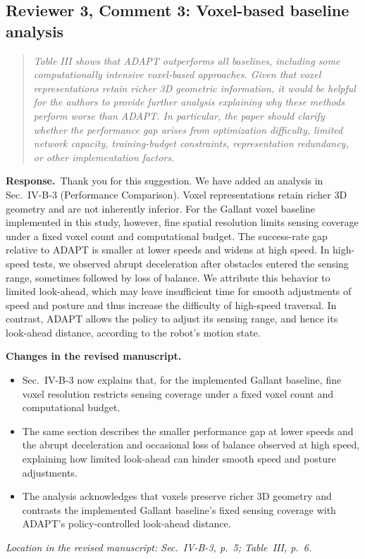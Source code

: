 \documentclass[11pt]{article}
\newenvironment{reviewcomment}{\begin{quote}\color{reviewblue}\itshape}{\end{quote}}
\newcommand{\Response}{\par\noindent\textbf{Response.}\ }
\newcommand{\Changes}{\par\noindent\textbf{Changes in the revised manuscript.}\ }
\newcommand{\Location}[1]{\par\noindent\textit{Location in the revised manuscript: #1}}
\begin{document}
\subsection*{Reviewer 3, Comment 3: Voxel-based baseline analysis}
\begin{reviewcomment}
Table III shows that ADAPT outperforms all baselines, including some computationally intensive voxel-based approaches. Given that voxel representations retain richer 3D geometric information, it would be helpful for the authors to provide further analysis explaining why these methods perform worse than ADAPT. In particular, the paper should clarify whether the performance gap arises from optimization difficulty, limited network capacity, training-budget constraints, representation redundancy, or other implementation factors.
\end{reviewcomment}
\Response Thank you for this suggestion. We have added an analysis in Sec.~IV-B-3 (Performance Comparison). Voxel representations retain richer 3D geometry and are not inherently inferior. For the Gallant voxel baseline implemented in this study, however, fine spatial resolution limits sensing coverage under a fixed voxel count and computational budget. The success-rate gap relative to ADAPT is smaller at lower speeds and widens at high speed. In high-speed tests, we observed abrupt deceleration after obstacles entered the sensing range, sometimes followed by loss of balance. We attribute this behavior to limited look-ahead, which may leave insufficient time for smooth adjustments of speed and posture and thus increase the difficulty of high-speed traversal. In contrast, ADAPT allows the policy to adjust its sensing range, and hence its look-ahead distance, according to the robot's motion state.
\Changes
\begin{itemize}
    \item Sec.~IV-B-3 now explains that, for the implemented Gallant baseline, fine voxel resolution restricts sensing coverage under a fixed voxel count and computational budget.
    \item The same section describes the smaller performance gap at lower speeds and the abrupt deceleration and occasional loss of balance observed at high speed, explaining how limited look-ahead can hinder smooth speed and posture adjustments.
    \item The analysis acknowledges that voxels preserve richer 3D geometry and contrasts the implemented Gallant baseline's fixed sensing coverage with ADAPT's policy-controlled look-ahead distance.
\end{itemize}
\Location{Sec.~IV-B-3, p.~5; Table~III, p.~6.}
\end{document}
